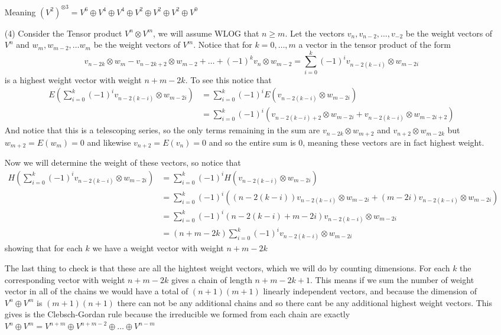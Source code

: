 \documentclass[12pt]{amsart}
\begin{document}
\begin{itemize}
    Meaning $(V^2)^{\otimes 3}=V^6\oplus V^4\oplus V^4\oplus V^2\oplus V^2\oplus V^2\oplus V^0$\\


    \item[(4)] %
    Consider the Tensor product $V^n\otimes V^m$, we will assume WLOG that $n\geq m$.
    Let the vectors $v_n,v_{n-2},\dots, v_{-2}$ be the weight vectors of $V^n$ and $w_m,w_{m-2},\dots w_m$ be 
    the weight vectors of $V^m$.
    Notice that for $k=0,\dots,m$ a vector in the tensor product of the form 
    \[v_{n-2k}\otimes w_m-v_{n-2k+2}\otimes w_{m-2}+\dots + (-1)^{k}v_{n}\otimes w_{m-2}=\sum_{i=0}^{k}(-1)^{i}v_{n-2(k-i)}\otimes w_{m-2i}\]
     is a highest weight vector with weight $n+m-2k$.
     To see this notice that 
     \begin{align*}
        E(\sum_{i=0}^{k}(-1)^{i}v_{n-2(k-i)}\otimes w_{m-2i})&=\sum_{i=0}^{k}(-1)^{i}E(v_{n-2(k-i)}\otimes w_{m-2i})\\
        &=\sum_{i=0}^{k}(-1)^{i}(v_{n-2(k-i)+2}\otimes w_{m-2i}+v_{n-2(k-i)}\otimes w_{m-2i+2})
     \end{align*}
    And notice that this is a telescoping series, so the only terms remaining in the sum are 
    $v_{n-2k}\otimes w_{m+2}$ and $v_{n+2}\otimes w_{m-2k}$ but $w_{m+2}=E(w_{m})=0$ and likewise 
    $v_{n+2}=E(v_{n})=0$ and so the entire sum is $0$, meaning these vectors are in fact highest weight.

    Now we will determine the weight of these vectors, so notice that
    \begin{align*}
        H(\sum_{i=0}^{k}(-1)^{i}v_{n-2(k-i)}\otimes w_{m-2i})&=\sum_{i=0}^{k}(-1)^{i}H(v_{n-2(k-i)}\otimes w_{m-2i})\\
     &=\sum_{i=0}^{k}(-1)^{i}((n-2(k-i))v_{n-2(k-i)}\otimes w_{m-2i}+(m-2i)v_{n-2(k-i)}\otimes w_{m-2i})\\
     &=\sum_{i=0}^{k}(-1)^{i}(n-2(k-i)+m-2i)v_{n-2(k-i)}\otimes w_{m-2i}\\
     &=(n+m-2k)\sum_{i=0}^{k}(-1)^{i}v_{n-2(k-i)}\otimes w_{m-2i}
    \end{align*}
     showing that for each $k$ we have a weight vector with weight $n+m-2k$

     The last thing to check is that these are all the hightest weight vectors, which we will do by counting dimensions. 
     For each $k$ the corresponding vector with weight $n+m-2k$ 
     gives a chain of length $n+m-2k+1$. This means if we sum the number of weight vector 
     in all of the chains we would have a total of $(n+1)(m+1)$ linearly independent vectors, 
     and because the dimension of $V^n\oplus V^m$ is $(m+1)(n+1)$ there can not be any additional chains
     and so there cant be any additional highest weight vectors. This gives is the Clebsch-Gordan rule because the irreducible we formed from each chain are exactly
     $V^n\oplus V^m=V^{n+m}\oplus V^{n+m-2}\oplus\dots\oplus V^{n-m}$



\end{itemize}
\end{document}
